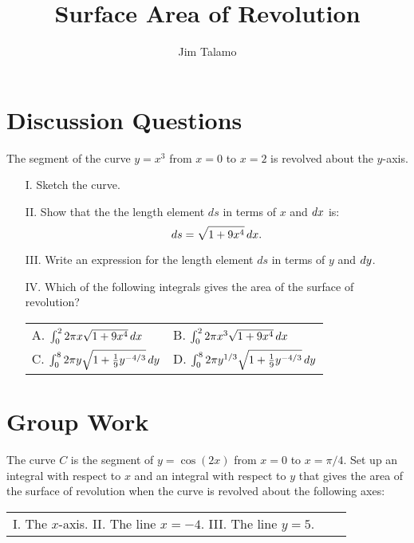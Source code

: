 \documentclass[handout]{ximera}
\author{Jim Talamo}
\title[]{Surface Area of Revolution}
\begin{document}
\begin{abstract}
\end{abstract}
\maketitle

\vspace{-0.9in}

\section{Discussion Questions}

\begin{problem}
The segment of the curve $y=x^3$ from $x=0$ to $x=2$ is revolved about the $y$-axis.  

\begin{enumerate}
\item[I.] Sketch the curve. 
\item[II.] Show that the the length element $ds$ in terms of $x$ and $\mathop{}\!d x$ is: \[ds = \sqrt{1+9x^4} \mathop{}\!d x.\]
\item[III.] Write an expression for the length element $ds$ in terms of $y$ and $\mathop{}\!d y$.
\item[IV.] Which of the following integrals gives the area of the surface of revolution?

\begin{tabular}{ll}
A. $\int_0^2 2\pi x \sqrt{1+9x^4} \mathop{}\!d x$ & B. $\int_0^2 2\pi x^3 \sqrt{1+9x^4} \mathop{}\!d x$  \\[4ex]
C. $\int_0^8 2\pi y \sqrt{1+\frac{1}{9}y^{-4/3}} \mathop{}\!d y$ \qquad \qquad & D. $\int_0^8 2\pi y^{1/3} \sqrt{1+\frac{1}{9}y^{-4/3}} \mathop{}\!d y$
\end{tabular}
\end{enumerate}
\end{problem}

\begin{freeResponse}

\end{freeResponse}

\section{Group Work}

\begin{problem}
The curve $C$ is the segment of $y=\cos(2x)$ from $x=0$ to $x=\pi/4$.  Set up an integral with respect to $x$ and an integral with respect to $y$ that gives the area of the surface of revolution when the curve is revolved about the following axes: 

\begin{tabular}{lll}
I. The $x$-axis. \qquad \qquad II. The line $x=-4$.  \qquad \qquad III. The line $y=5$.
\end{tabular}

\begin{freeResponse}

\end{freeResponse}

\end{problem}
\end{document}
